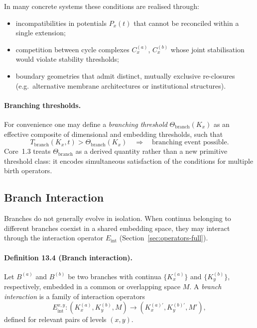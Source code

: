 In many concrete systems these conditions are realised through:
\begin{itemize}
  \item incompatibilities in potentials \(P_x(t)\) that cannot be reconciled
        within a single extension;
  \item competition between cycle complexes \(C_x^{(a)}\), \(C_x^{(b)}\)
        whose joint stabilisation would violate stability thresholds;
  \item boundary geometries that admit distinct, mutually exclusive
        re-closures (e.g.\ alternative membrane architectures or
        institutional structures).
\end{itemize}

\paragraph{Branching thresholds.}
For convenience one may define a \emph{branching threshold}
\(\Theta_{\mathrm{branch}}(K_x)\) as an effective composite of dimensional
and embedding thresholds, such that
\[
  T_{\mathrm{branch}}(K_x,t) > \Theta_{\mathrm{branch}}(K_x)
  \quad\Rightarrow\quad
  \text{branching event possible.}
\]
Core~1.3 treats \(\Theta_{\mathrm{branch}}\) as a derived quantity rather
than a new primitive threshold class: it encodes simultaneous satisfaction of
the conditions for multiple birth operators.

\subsection{Branch Interaction}

Branches do not generally evolve in isolation. When continua belonging to
different branches coexist in a shared embedding space, they may interact
through the interaction operator \(E_{\mathrm{int}}\)
(Section~\ref{sec:operators-full}).

\paragraph{Definition 13.4 (Branch interaction).}
Let \(B^{(a)}\) and \(B^{(b)}\) be two branches with continua
\(\{K_x^{(a)}\}\) and \(\{K_y^{(b)}\}\), respectively, embedded in a common or
overlapping space \(M\). A \emph{branch interaction} is a family of interaction
operators
\[
  E_{\mathrm{int}}^{x,y} :
    (K_x^{(a)}, K_y^{(b)}, M)
    \longrightarrow (K_x^{(a)\prime}, K_y^{(b)\prime}, M'),
\]
defined for relevant pairs of levels \((x,y)\).

